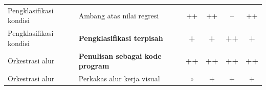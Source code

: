 \begin{longtable}{@{}p{2.4cm}p{3.4cm}cccc@{}}
\midrule

Pengklasifikasi kondisi & Ambang atas nilai regresi & ++ & ++ & -- & ++ \\

Pengklasifikasi kondisi & \textbf{Pengklasifikasi terpisah} & \textbf{+} & \textbf{+} & \textbf{++} & \textbf{+} \\

\midrule

Orkestrasi alur & \textbf{Penulisan sebagai kode program} & \textbf{++} & \textbf{++} & \textbf{++} & \textbf{++} \\

Orkestrasi alur & Perkakas alur kerja visual & $\circ$ & + & + & + \\
\end{longtable}
\endgroup
